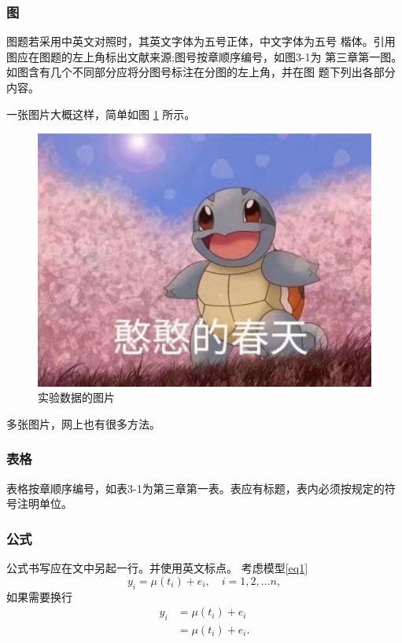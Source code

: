 \documentclass{SUFEThesis}
\begin{document}
\subsubsection{图}
图题若采用中英文对照时，其英文字体为五号正体，中文字体为五号 楷体。引用图应在图题的左上角标出文献来源;图号按章顺序编号，如图3-1为 第三章第一图。如图含有几个不同部分应将分图号标注在分图的左上角，并在图 题下列出各部分内容。\par
一张图片大概这样，简单如图 \ref{fig:hanhan} 所示。
\begin{figure}[!ht]
  \centering
  \includegraphics[width=0.45\linewidth]{图片1.jpg}
  \caption{实验数据的图片}
  \label{fig:hanhan}
\end{figure} 
多张图片，网上也有很多方法。
\subsubsection{表格}
表格按章顺序编号，如表3-1为第三章第一表。表应有标题，表内必须按规定的符号注明单位。
\subsubsection{公式}
公式书写应在文中另起一行。并使用英文标点。
考虑模型\eqref{eq1}
\begin{equation}
y_i = \mu(t_i) + e_i, \quad i = 1,2,\dots n,
\label{eq1}
\end{equation}
如果需要换行
\begin{equation}
  \begin{aligned}
  y_i &= \mu(t_i) + e_i\\
      &= \mu(t_i) + e_i.\\
  \end{aligned}
\end{equation}
\end{document}
